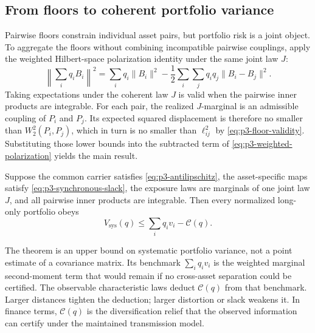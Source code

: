 \subsection{From floors to coherent portfolio variance}

Pairwise floors constrain individual asset pairs, but portfolio risk is a joint
object.
To aggregate the floors without combining incompatible pairwise couplings,
apply the weighted Hilbert-space polarization identity under the same joint law
$J$:
\begin{equation}\label{eq:p3-weighted-polarization}
  \left\lVert\sum_i q_i B_i\right\rVert^2
  =\sum_i q_i\lVert B_i\rVert^2
  -\frac12\sum_i \sum_j q_i q_j\lVert B_i-B_j\rVert^2.
\end{equation}
Taking expectations under the coherent law $J$ is valid when the pairwise
inner products are integrable.
For each pair, the realized $J$-marginal is an admissible coupling of
$P_i$ and $P_j$.
Its expected squared displacement is therefore no smaller than
$W_2^2(P_i,P_j)$, which in turn is no smaller than $\ell_{ij}^2$ by
\eqref{eq:p3-floor-validity}.
Substituting those lower bounds into the subtracted term of
\eqref{eq:p3-weighted-polarization} yields the main result.

\begin{theorem}
  \label{thm:p3-information-certified-cap}
  Suppose the common carrier satisfies \eqref{eq:p3-antilipschitz}, the
  asset-specific maps satisfy \eqref{eq:p3-synchronous-slack}, the exposure
  laws are marginals of one joint law $J$, and all pairwise inner products are
  integrable.
  Then every normalized long-only portfolio obeys
  \begin{equation}\label{eq:p3-systematic-cap}
    V_{\mathrm{sys}}(q)
    \le \sum_i q_i v_i-\mathcal C(q).
  \end{equation}
\end{theorem}

The theorem is an upper bound on systematic portfolio variance, not a point
estimate of a covariance matrix.
Its benchmark $\sum_i q_i v_i$ is the weighted marginal second-moment term that
would remain if no cross-asset separation could be certified.
The observable characteristic laws deduct $\mathcal C(q)$ from that benchmark.
Larger distances tighten the deduction; larger distortion or slack weakens it.
In finance terms, $\mathcal C(q)$ is the diversification relief that the
observed information can certify under the maintained transmission model.

